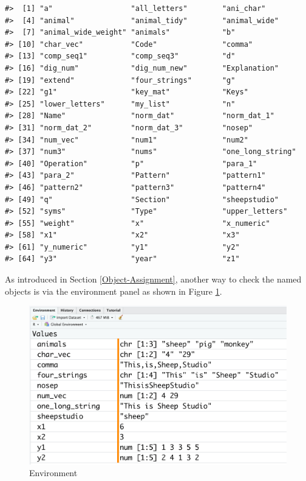 \documentclass[
]{book}
\begin{document}
\begin{verbatim}
#>  [1] "a"                  "all_letters"        "ani_char"          
#>  [4] "animal"             "animal_tidy"        "animal_wide"       
#>  [7] "animal_wide_weight" "animals"            "b"                 
#> [10] "char_vec"           "Code"               "comma"             
#> [13] "comp_seq1"          "comp_seq3"          "d"                 
#> [16] "dig_num"            "dig_num_new"        "Explanation"       
#> [19] "extend"             "four_strings"       "g"                 
#> [22] "g1"                 "key_mat"            "Keys"              
#> [25] "lower_letters"      "my_list"            "n"                 
#> [28] "Name"               "norm_dat"           "norm_dat_1"        
#> [31] "norm_dat_2"         "norm_dat_3"         "nosep"             
#> [34] "num_vec"            "num1"               "num2"              
#> [37] "num3"               "nums"               "one_long_string"   
#> [40] "Operation"          "p"                  "para_1"            
#> [43] "para_2"             "Pattern"            "pattern1"          
#> [46] "pattern2"           "pattern3"           "pattern4"          
#> [49] "q"                  "Section"            "sheepstudio"       
#> [52] "syms"               "Type"               "upper_letters"     
#> [55] "weight"             "x"                  "x_numeric"         
#> [58] "x1"                 "x2"                 "x3"                
#> [61] "y_numeric"          "y1"                 "y2"                
#> [64] "y3"                 "year"               "z1"
\end{verbatim}

As introduced in Section \ref{Object-Assignment}, another way to check the named objects is via the environment panel as shown in Figure \ref{fig:enviro}.

\begin{figure}

{\centering \includegraphics[width=0.7\linewidth]{pics/2enviro} 

}

\caption{Environment}\label{fig:enviro}
\end{figure}
\end{document}
